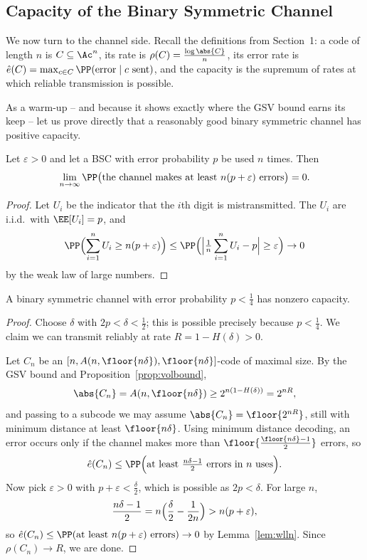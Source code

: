 \subsection{Capacity of the Binary Symmetric Channel}

We now turn to the channel side. Recall the definitions from Section~1: a code of length $n$ is $C \subseteq \Ac^n$, its rate is $\rho(C) = \frac{\log\abs{C}}{n}$, its error rate is $\hat e(C) = \max_{c \in C}\PP(\text{error}\mid c \text{ sent})$, and the capacity is the supremum of rates at which reliable transmission is possible.

As a warm-up -- and because it shows exactly where the GSV bound earns its keep -- let us prove directly that a reasonably good binary symmetric channel has positive capacity.

\begin{lemma}\label{lem:wlln}
	Let $\varepsilon>0$ and let a BSC with error probability $p$ be used $n$ times. Then
	$$\lim_{n\to\infty}\PP\bigl(\text{the channel makes at least } n(p+\varepsilon) \text{ errors}\bigr) = 0.$$
\end{lemma}

\begin{proof}
	Let $U_i$ be the indicator that the $i$th digit is mistransmitted. The $U_i$ are i.i.d.\ with $\EE[U_i] = p$, and
	$$\PP\Bigl(\sum_{i=1}^n U_i \ge n(p+\varepsilon)\Bigr) \le \PP\Bigl(\Bigl\lvert\tfrac1n\sum_{i=1}^n U_i - p\Bigr\rvert \ge \varepsilon\Bigr) \to 0$$
	by the weak law of large numbers.
\end{proof}

\begin{proposition}
	A binary symmetric channel with error probability $p < \tfrac14$ has nonzero capacity.
\end{proposition}

\begin{proof}
	Choose $\delta$ with $2p < \delta < \tfrac12$; this is possible precisely because $p< \tfrac14$. We claim we can transmit reliably at rate $R = 1-H(\delta) > 0$.

	Let $C_n$ be an $[n, A(n,\floor{n\delta}), \floor{n\delta}]$-code of maximal size. By the GSV bound and Proposition~\ref{prop:volbound},
	$$\abs{C_n} = A(n,\floor{n\delta}) \ge 2^{n(1-H(\delta))} = 2^{nR},$$
	and passing to a subcode we may assume $\abs{C_n} = \floor{2^{nR}}$, still with minimum distance at least $\floor{n\delta}$. Using minimum distance decoding, an error occurs only if the channel makes more than $\floor{\frac{\floor{n\delta}-1}{2}}$ errors, so
	$$\hat e(C_n) \le \PP\Bigl(\text{at least } \tfrac{n\delta-1}{2} \text{ errors in } n \text{ uses}\Bigr).$$
	Now pick $\varepsilon>0$ with $p+\varepsilon < \frac{\delta}{2}$, which is possible as $2p<\delta$. For large $n$,
	$$\frac{n\delta-1}{2} = n\Bigl(\frac{\delta}{2}-\frac{1}{2n}\Bigr) > n(p+\varepsilon),$$
	so $\hat e(C_n) \le \PP(\text{at least } n(p+\varepsilon) \text{ errors})\to 0$ by Lemma~\ref{lem:wlln}. Since $\rho(C_n)\to R$, we are done.
\end{proof}


